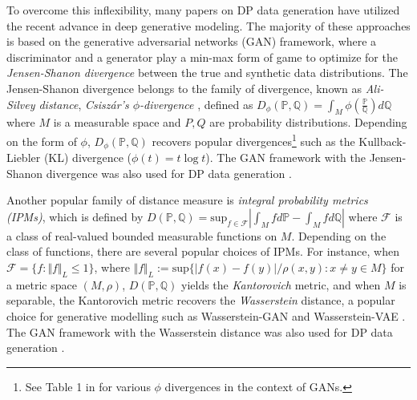\documentclass{article}
\newcommand{\mpsay}[1]{[\textbf{MP:} \textcolor{red!60!black}{#1}]}
\begin{document}
To overcome this inflexibility, many papers on DP data generation have utilized the recent advance in deep generative modeling. %
The majority of these approaches is based on
the generative adversarial networks (GAN) \cite{NIPS2014_5423} framework, where a discriminator and a generator play a  min-max form of game to optimize for 
%
 the \textit{Jensen-Shanon divergence} between the true and  synthetic data distributions.   
%
The Jensen-Shanon divergence belongs to the family of divergence, known as \textit{Ali-Silvey distance}, \textit{Csisz\'ar's $\phi$-divergence} \cite{CIT-004}, defined as
$D_{\phi}(\mathbb{P},\mathbb{Q}) = \int_{M} \phi \left(\frac{\mathbb{P}}{\mathbb{Q}}\right) d\mathbb{Q}$
where $M$ is a measurable space and $P,Q$ are probability distributions.
Depending on the form of $\phi$, $D_{\phi}(\mathbb{P},\mathbb{Q})$ recovers popular divergences\footnote{See Table 1 in \citep{nowozin2016} for various $\phi$ divergences in the context of GANs.} such as the Kullback-Liebler (KL) divergence ($\phi(t)=t\log t$).
%
The GAN framework with the Jensen-Shanon divergence was also used for DP data generation \cite{10.14778/3231751.3231757, DP_CGAN, PATE_GAN}.

  


Another popular family of distance measure is \textit{integral probability metrics (IPMs)}, which is defined by 
$D(\mathbb{P},\mathbb{Q}) = \mbox{sup}_{f \in \mathcal{F}} \left| \int_{M} f d \mathbb{P} - \int_{M} f d\mathbb{Q} \right|$ where  $\mathcal{F}$ is a class of real-valued bounded measurable functions on $M$. 
%
Depending on the class of functions, there are several popular choices of IPMs.
%
For instance, when $\mathcal{F} = \{f: \Vert f \Vert_L \leq 1 \}$, where $\Vert f \Vert_L := \mbox{sup}\{|f(x)-f(y)|/\rho(x,y): x\neq y \in M \}$ for a metric space $(M, \rho)$, 
$D(\mathbb{P},\mathbb{Q})$ yields the \textit{Kantorovich} metric, and when $M$ is separable, the Kantorovich metric 
recovers the
\textit{Wasserstein} distance, a popular choice for generative modelling such as Wasserstein-GAN and Wasserstein-VAE \citep{Arjovsky2017WassersteinG, tolstikhin2018wasserstein}. The GAN framework with the Wasserstein distance was also used for DP data generation \cite{DPGAN, DBLP:conf/sec/FrigerioOGD19}.
\end{document}
